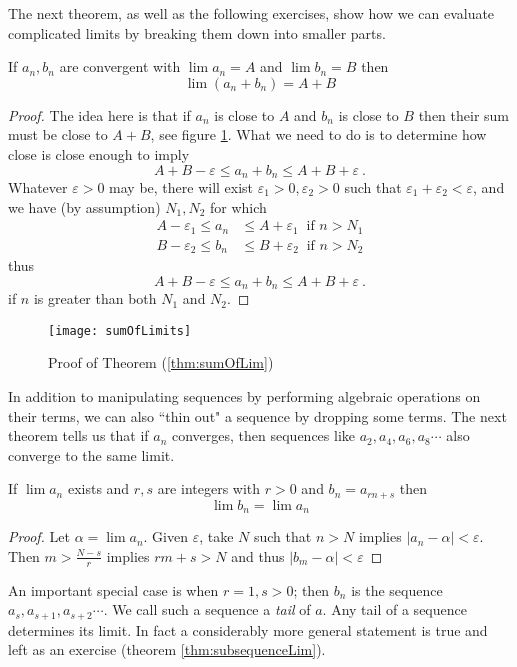 The next theorem, as well as the following exercises, show how we can evaluate complicated limits by breaking them down into smaller parts.
\begin{thm}\label{thm:sumOfLim}
If $a_n,b_n$ are convergent with $\lim a_n=A$ and $\lim b_n=B$ then
\[
\lim (a_n + b_n) = A+B
\]  
\end{thm}
\begin{proof}
The idea here is that if $a_n$ is close to $A$ and $b_n$ is close to $B$ then their sum must be close to $A+B$, see figure \ref{fig:sumOfLim}. What we need to do is to determine how close is close enough to imply
\[
A+B-\varepsilon \leq a_n+b_n \leq A+B + \varepsilon \ .
\]
Whatever $\varepsilon>0$ may be, there will exist $\varepsilon_1>0, \varepsilon_2>0$ such that $\varepsilon_1 + \varepsilon_2 < \varepsilon$, and we have (by assumption) $N_1,N_2$ for which
\begin{align*}
A-\varepsilon_1 \leq a_n &\leq A+ \varepsilon_1 \ \mbox{ if } n > N_1\\
B-\varepsilon_2 \leq b_n &\leq B+ \varepsilon_2 \ \mbox{ if } n > N_2
\end{align*}
thus
\[
A+B-\varepsilon \leq a_n+b_n \leq A+B + \varepsilon \ .
\]
if $n$ is greater than both $N_1$ and $N_2$.

\end{proof}
\begin{figure}
\begin{center}
\texttt{[image: sumOfLimits]}
\end{center}
\caption{Proof of Theorem (\ref{thm:sumOfLim})\label{fig:sumOfLim}}
\end{figure}

In addition to manipulating sequences by performing algebraic operations on their terms, we can also ``thin out" a sequence by dropping some terms. The next theorem tells us that if $a_n$ converges, then sequences like $a_2,a_4,a_6,a_8\cdots$ also converge to the same limit.
\begin{thm}\label{thm:arithmeticSubsequenceLim}
If $\lim a_n$ exists and $r,s$ are integers with $r>0$ and $b_n=a_{rn+s}$ then
\[
\lim b_n = \lim a_n
\]
\begin{proof}
Let $\alpha=\lim a_n$. Given $\varepsilon$, take $N$ such that $n>N$ implies $|a_n-\alpha|<\varepsilon$. Then $m > \frac{N-s}{r}$ implies $rm+s>N$ and thus $|b_m-\alpha|<\varepsilon$
\end{proof}
\end{thm}
An important special case is when $r=1, s>0$; then $b_n$ is the sequence $a_s, a_{s+1}, a_{s+2}\cdots$. We call such a sequence a \emph{tail} of $a$. Any tail of a sequence determines its limit.%
In fact a considerably more general statement is true and left as an exercise (theorem \ref{thm:subsequenceLim}).


